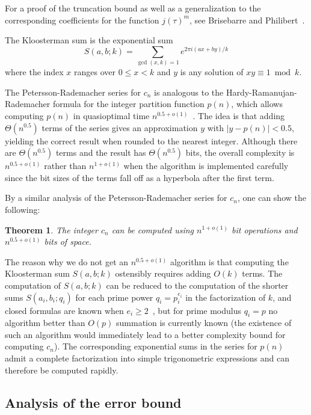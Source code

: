 \documentclass{amsart}
\newtheorem{theorem}{Theorem}[section]
\theoremstyle{definition}
\theoremstyle{remark}
\begin{document}
For a proof of the truncation bound as well as a generalization
to the corresponding coefficients for the function $j(\tau)^m$,
see Brisebarre and Philibert~\cite{Brisebarre2005}.

The Kloosterman sum is the exponential sum
$$S(a,b;k) = \sum_{\gcd(x,k) = 1} e^{2\pi i (ax+by) / k}$$
where the index $x$ ranges over $0 \le x < k$ and $y$ is any solution of $xy \equiv 1 \bmod k$.

The Petersson-Rademacher series for $c_n$ is analogous to the Hardy-Ramanujan-Rademacher
formula for the integer partition function $p(n)$,
which allows computing $p(n)$ in
quasioptimal time $n^{0.5+o(1)}$~\cite{Johansson2012hrr,Johansson2014thesis}.
The idea is that adding $\Theta(n^{0.5})$
terms of the series gives an approximation $y$ with $|y - p(n)| < 0.5$,
yielding the correct result when rounded to the nearest integer.
Although there are $\Theta(n^{0.5})$ terms and the result has
$\Theta(n^{0.5})$ bits, the overall complexity is $n^{0.5+o(1)}$ rather than $n^{1+o(1)}$
when the algorithm is implemented carefully
since the bit sizes of the terms fall off as a hyperbola after the first term.

By a similar analysis of the Petersson-Rademacher series for $c_n$, one can show the following:

\begin{theorem}
The integer $c_n$ can be computed using $n^{1+o(1)}$ bit operations and $n^{0.5+o(1)}$ bits of space.
\label{thm:complexity}
\end{theorem}

The reason why we do not get an $n^{0.5+o(1)}$ algorithm
is that computing the Kloosterman sum $S(a,b;k)$ ostensibly requires adding $O(k)$ terms.
The computation of 
$S(a,b;k)$ can be reduced to the computation of the shorter sums $S(a_i,b_i;q_i)$
for each prime power $q_i = p_i^{e_i}$ in the factorization of $k$,
and closed formulas are known when $e_i \ge 2$~\cite{whiteman1945note}, but for prime modulus
$q_i = p$ no algorithm better than $O(p)$ summation is currently known
(the existence of such an algorithm would immediately lead
to a better complexity bound for computing $c_n$).
The corresponding exponential sums in the series for $p(n)$
admit a complete factorization into simple trigonometric expressions
and can therefore be computed rapidly.

\subsection{Analysis of the error bound}
\end{document}
